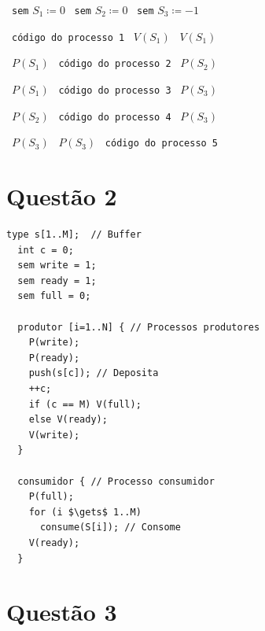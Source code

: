\documentclass{amsart}
\theoremstyle{plain}
\numberwithin{equation}{section}
\begin{document}
\begin{algorithm}
  \caption{}
  \begin{algorithmic}[1]
    \State~\texttt{sem} $S_1 \coloneqq 0$
    \State~\texttt{sem} $S_2 \coloneqq 0$
    \State~\texttt{sem} $S_3 \coloneqq -1$

      \State~\texttt{código do processo 1}
      \State~$V(S_1)$
      \State~$V(S_1)$
    \EndFunction

      \State~$P(S_1)$
      \State~\texttt{código do processo 2}
      \State~$P(S_2)$
    \EndFunction

      \State~$P(S_1)$
      \State~\texttt{código do processo 3}
      \State~$P(S_3)$
    \EndFunction

      \State~$P(S_2)$
      \State~\texttt{código do processo 4}
      \State~$P(S_3)$
    \EndFunction

      \State~$P(S_3)$
      \State~$P(S_3)$
      \State~\texttt{código do processo 5}
    \EndFunction
  \end{algorithmic}
\end{algorithm}

\section*{Questão 2}

\begin{lstlisting}[mathescape=true]
  type s[1..M];  // Buffer
  int c = 0;
  sem write = 1;
  sem ready = 1;
  sem full = 0;

  produtor [i=1..N] { // Processos produtores
    P(write);
    P(ready);
    push(s[c]); // Deposita
    ++c;
    if (c == M) V(full);
    else V(ready);
    V(write);
  }

  consumidor { // Processo consumidor
    P(full);
    for (i $\gets$ 1..M)
      consume(S[i]); // Consome
    V(ready);
  }
\end{lstlisting}

\section*{Questão 3}
\end{document}
